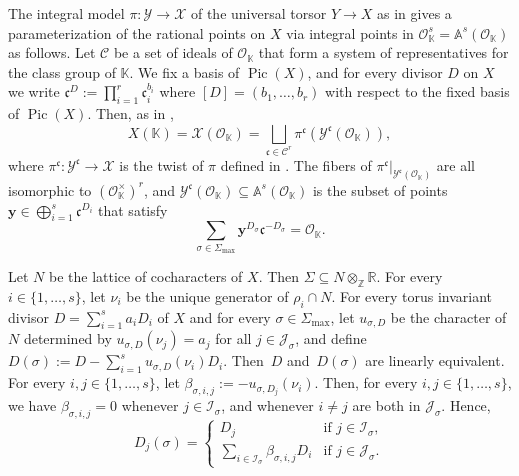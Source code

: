 \documentclass[11pt]{article}
\numberwithin{equation}{section}
\newcommand{\bfy}{\boldsymbol{y}}
\newcommand{\OO}{\mathcal{O}}
\newcommand\ZZ{\mathbb{Z}}
\newcommand\RR{\mathbb{R}}
\newcommand{\KK}{\mathbb{K}}
\newcommand{\A}{\mathbb{A}}
\newcommand{\gen}[1]{\nu_{#1}}
\newcommand{\ii}[1]{\mathcal{J}_{#1}}
\newcommand{\ic}[1]{\mathcal{I}_{#1}}
\DeclareMathOperator{\pic}{Pic}
\theoremstyle{definition}
\numberwithin{theorem}{section}
\begin{document}
The integral model $\pi:\mathscr{Y}\to\mathscr{X}$ of the universal torsor $Y\to X$
as in \cite[Rem.\,8.6]{MR1679841} gives a parameterization of the rational points
on $X$ via integral points in $\OO_{\KK}^s=\A^s(\OO_{\KK})$ as follows.
Let $\mathcal{C}$ be a set of ideals of $\OO_{\KK}$ that form a system of representatives
for the class group of $\KK$.
We fix a basis of $\pic(X)$, and
for every divisor $D$ on $X$ we write $\mathfrak c^{D}:=\prod_{i=1}^r \mathfrak c_i^{b_i}$ where
$[D]=(b_1,\dots,b_r)$ with respect to the fixed basis of $\pic(X)$.
Then, as in \cite[\S2]{MR3514738},
\[
X(\KK)=\mathscr X(\OO_{\KK})=
\bigsqcup_{\mathfrak c\in\mathcal C^{r}}\pi^{\mathfrak c}
\left(\mathscr{Y}^{\mathfrak c}(\OO_{\KK})\right),
\]
where $\pi^{\mathfrak c}:\mathscr{Y}^{\mathfrak c}\to\mathscr X$ is the twist
of $\pi$ defined in \cite[Th.\,2.7]{MR3552013}.
The fibers of $\pi^{\mathfrak c}|_{\mathscr{Y}^{\mathfrak c}(\OO_{\KK})}$ are all isomorphic to
$(\OO_{\KK}^\times)^{r}$, and
$\mathscr{Y}^{\mathfrak c}(\OO_{\KK})\subseteq \A^s(\OO_{\KK})$ is the subset of
points $\bfy\in \bigoplus_{i=1}^s\mathfrak c^{D_i}$ that satisfy
\begin{equation}
\label{eq:coprimality_condition}
\sum_{\sigma\in\Sigma_{\max}}\bfy^{D_\sigma}\mathfrak c^{-D_\sigma}=\OO_{\KK}.
\end{equation}

Let $N$ be the lattice of cocharacters of $X$. Then $\Sigma\subseteq N\otimes_\ZZ\RR$.
For every $i\in\{1,\dots,s\}$, let $\gen{i}$ be the unique generator of $\rho_i\cap N$.
For every torus invariant divisor $D=\sum_{i=1}^s a_i D_i$ of $X$ and for every
$\sigma\in\Sigma_{\max}$, let $u_{\sigma,D}$ be the character of $N$ deter\-mined by
$u_{\sigma,D}(\gen{j})=a_j$ for all $j\in\ii{\sigma}$, and define
$D(\sigma):=D-\sum_{i=1}^su_{\sigma,D}(\gen{i})D_i$.
Then~$D$ and~$D(\sigma)$ are linearly equivalent.
For every $i,j\in\{1,\dots,s\}$, let $\beta_{\sigma,i,j}:=-u_{\sigma,D_{j}}(\gen{i})$.
Then, for every $i,j \in\{1,\dots,s\}$, we have $\beta_{\sigma,i,j}=0$ whenever
$j\in\ic{\sigma}$, and whenever $i \neq j$ are both in $\ii{\sigma}$. Hence,
\begin{equation}
\label{eq:D_rho_sigma}
D_{j}(\sigma)=\begin{cases}
D_{j} & \text{if } j\in\ic{\sigma},\\
\sum_{i\in\ic{\sigma}}\beta_{\sigma,i,j}D_{i} & \text{if } j\in\ii{\sigma}.
\end{cases}
\end{equation}
\end{document}
